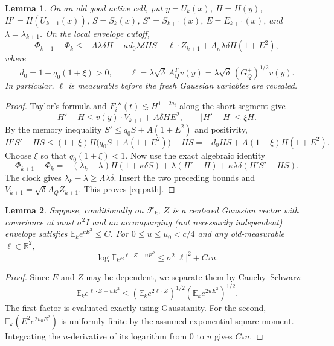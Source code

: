 \documentclass[11pt]{article}
\newtheorem{lemma}[lemma]{Lemma}
\theoremstyle{definition}
\theoremstyle{remark}
\numberwithin{equation}{section}
\newcommand{\R}{\mathbb R}
\newcommand{\E}{\mathbb E}
\newcommand{\F}{\mathcal F}
\begin{document}
\begin{lemma}\label{lem:path}
On an old good active cell, put
$y=U_k(x)$, $H=H(y)$, $H'=H(U_{k+1}(x))$,
$S=S_k(x)$, $S'=S_{k+1}(x)$, $E=E_{k+1}(x)$, and
$\lambda=\lambda_{k+1}$. On the local envelope cutoff,
\begin{equation}\label{eq:path}
 \Phi_{k+1}-\Phi_k
 \le-\Lambda\lambda\delta H
       -\kappa d_0\lambda\delta HS
       +\ell\cdot Z_{k+1}
       +A_\kappa\lambda\delta H(1+E^2),
\end{equation}
where
\[
 d_0=1-q_0(1+\xi)>0,
 \qquad \ell=\lambda\sqrt\delta\,A_Q^Tv(y)
       =\lambda\sqrt\delta\,(G_Q^+)^{1/2}v(y).
\]
In particular, $\ell$ is measurable \emph{before} the fresh Gaussian
variables are revealed.
\end{lemma}
\begin{proof}
Taylor's formula and $F_i''(t)\lesssim H^{1-2a_i}$ along the
short segment give
\begin{equation}\label{eq:taylor}
 H'-H\le v(y)\cdot V_{k+1}+A\delta H E^2,
 \qquad |H'-H|\le\xi H.
\end{equation}
By the memory inequality $S'\le q_0S+A(1+E^2)$ and positivity,
\[
 H'S'-HS
 \le (1+\xi)H\bigl(q_0S+A(1+E^2)\bigr)-HS
 =-d_0HS+A(1+\xi)H(1+E^2).
\]
Choose $\xi$ so that $q_0(1+\xi)<1$. Now use the exact
algebraic identity
\[
 \Phi_{k+1}-\Phi_k
 =-(\lambda_k-\lambda)H(1+\kappa\delta S)
   +\lambda(H'-H)+\kappa\lambda\delta(H'S'-HS).
\]
The clock gives $\lambda_k-\lambda\ge\Lambda\lambda\delta$.
Insert the two preceding bounds and
$V_{k+1}=\sqrt\delta A_QZ_{k+1}$.
This proves \eqref{eq:path}.
\end{proof}

\begin{lemma}\label{lem:joint}
Suppose, conditionally on $\F_k$, $Z$ is a centered Gaussian
vector with covariance at most $\sigma^2I$ and an accompanying
(not necessarily independent) envelope satisfies $\E_ke^{cE^2}\le C$.
For $0\le u\le u_0<c/4$ and any old-measurable $\ell\in\R^2$,
\begin{equation}\label{eq:joint}
 \log\E_ke^{\ell\cdot Z+uE^2}
       \le \sigma^2|\ell|^2+C_*u.
\end{equation}
\end{lemma}
\begin{proof}
Since $E$ and $Z$ may be dependent, we separate them by
Cauchy--Schwarz:
\[
 \E_ke^{\ell\cdot Z+uE^2}
 \le (\E_ke^{2\ell\cdot Z})^{1/2}
      (\E_ke^{2uE^2})^{1/2}.
\]
The first factor is evaluated exactly using Gaussianity.
For the second, $\E_k(E^2e^{2u_0E^2})$ is uniformly finite
by the assumed exponential-square moment. Integrating the
$u$-derivative of its logarithm from $0$ to $u$ gives $C_*u$.
\end{proof}
\end{document}
